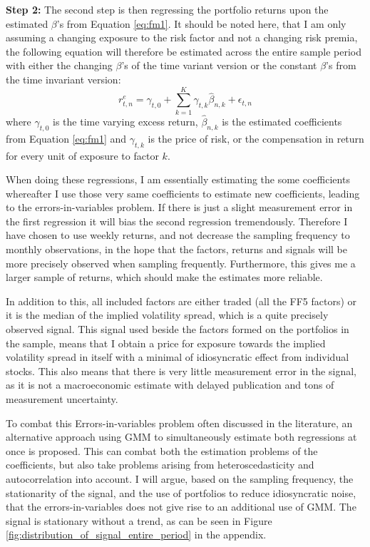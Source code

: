 \textbf{Step 2: } The second step is then regressing the portfolio returns upon the estimated $\beta$'s from Equation \ref{eq:fm1}. It should be noted here, that I am only assuming a changing exposure to the risk factor and not a changing risk premia, the following equation will therefore be estimated across the entire sample period with either the changing $\beta$'s of the time variant version or the constant $\beta$'s from the time invariant version:
\begin{equation}
	r_{t,n}^{e}=\gamma_{t,0}+\sum_{k=1}^{K}\gamma_{t,k}\widehat{\beta}_{n,k}+\epsilon_{t,n}
	\label{eq:fm2}
\end{equation} 
where $\gamma_{t,0}$ is the time varying excess return, $\widehat{\beta}_{n,k}$ is the estimated coefficients from Equation \ref{eq:fm1} and $\gamma_{t,k}$ is the price of risk, or the compensation in return for every unit of exposure to factor $k$.

When doing these regressions, I am essentially estimating the some coefficients whereafter I use those very same coefficients to estimate new coefficients, leading to the errors-in-variables problem. If there is just a slight measurement error in the first regression it will bias the second regression tremendously. Therefore I have chosen to use weekly returns, and not decrease the sampling frequency to monthly observations, in the hope that the factors, returns and signals will be more precisely observed when sampling frequently. Furthermore, this gives me a larger sample of returns, which should make the estimates more reliable. 

In addition to this, all included factors are either traded (all the FF5 factors) or it is the median of the implied volatility spread, which is a quite precisely observed signal. This signal used beside the factors formed on the portfolios in the sample, means that I obtain a price for exposure towards the implied volatility spread in itself with a minimal of idiosyncratic effect from individual stocks. This also means that there is very little measurement error in the signal, as it is not a macroeconomic estimate with delayed publication and tons of measurement uncertainty. 

To combat this Errors-in-variables problem often discussed in the literature, an alternative approach using GMM to simultaneously estimate both regressions at once is proposed. This can combat both the estimation problems of the coefficients, but also take problems arising from heteroscedasticity and autocorrelation into account. I will argue, based on the sampling frequency, the stationarity of the signal, and the use of portfolios to reduce idiosyncratic noise, that the errors-in-variables does not give rise to an additional use of GMM. The signal is stationary without a trend, as can be seen in Figure \ref{fig:distribution_of_signal_entire_period} in the appendix.

